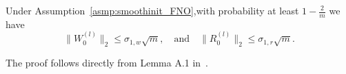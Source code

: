 \begin{lemm}
    \label{lemm:InitParamFNO}
    Under Assumption~\ref{asmp:smoothinit_FNO},with probability at least $1-\frac{2}{m}$ we have
\begin{equation}
    \|W^{(l)}_0\|_2 \leq \sigma_{1,w}\sqrt{m}, \quad \text{and} \quad \|R^{(l)}_0\|_2 \leq \sigma_{1,r}\sqrt{m}.
    \label{eq:Wl_zero_Rl_zero}
\end{equation}
\end{lemm}
\proof The proof follows directly from Lemma A.1 in~\citep{banerjee2022restricted}. 
